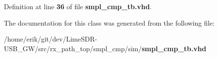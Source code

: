 Definition at line {\bf 36} of file {\bf smpl\+\_\+cmp\+\_\+tb.\+vhd}.



The documentation for this class was generated from the following file\+:\begin{DoxyCompactItemize}
\item 
/home/erik/git/dev/\+Lime\+S\+D\+R-\/\+U\+S\+B\+\_\+\+G\+W/src/rx\+\_\+path\+\_\+top/smpl\+\_\+cmp/sim/{\bf smpl\+\_\+cmp\+\_\+tb.\+vhd}\end{DoxyCompactItemize}
